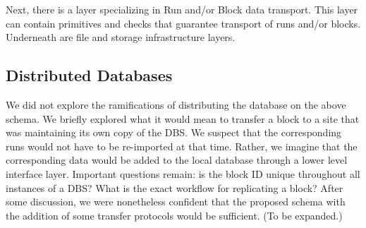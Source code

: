 \documentclass{cmspaper}
\begin{document}
\begin{figure}[hbtp]
  \begin{center}
    \caption{}
    \label{fig:ex3}
  \end{center}
\end{figure}

Next, there is a layer specializing in Run and/or Block data transport.  
This layer can contain primitives and checks that guarantee transport of 
runs and/or blocks.  Underneath are file and storage infrastructure layers.

\subsection{Distributed Databases}

We did not explore the ramifications of distributing the database on the above schema.  
We briefly explored what it would mean to transfer a block to a site that was maintaining 
its own copy of the DBS.  We suspect that the corresponding runs would not have to be 
re-imported at that time.  Rather, we imagine that the corresponding data would be added 
to the local database through a lower level interface layer.  Important questions remain:  
is the block ID unique throughout all instances of a DBS?  What is the exact workflow for 
replicating a block?   After some discussion, we were nonetheless confident that the 
proposed schema with the addition of some transfer protocols would be sufficient.  
(To be expanded.) 
\end{document}

